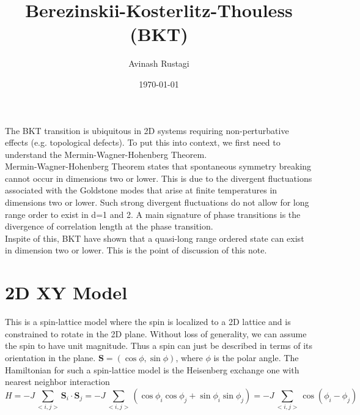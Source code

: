 \documentclass[aps,prb,onecolumn,notitlepage,showpacs,floatfix,superscriptaddress]{revtex4-1}
\begin{document}
\title{Berezinskii-Kosterlitz-Thouless (BKT)}

\author{Avinash Rustagi}
%
\date{\today}

\maketitle

The BKT transition is ubiquitous in 2D systems requiring non-perturbative effects (e.g. topological defects). To put this into context, we first need to understand the Mermin-Wagner-Hohenberg Theorem. \\

Mermin-Wagner-Hohenberg Theorem states that spontaneous symmetry breaking cannot occur in dimensions two or lower. This is due to the divergent fluctuations associated with the Goldstone modes that arise at finite temperatures in dimensions two or lower. Such strong divergent fluctuations do not allow for long range order to exist in d=1 and 2. A main signature of phase transitions is the divergence of correlation length at the phase transition. \\

Inspite of this, BKT have shown that a quasi-long range ordered state can exist in dimension two or lower. This is the point of discussion of this note.

\section{2D XY Model}
This is a spin-lattice model where the spin is localized to a 2D lattice and is constrained to rotate in the 2D plane. Without loss of generality, we can assume the spin to have unit magnitude. Thus a spin can just be described in terms of its orientation in the plane. ${\bm S}=(\cos\phi, \sin \phi)$, where $\phi$ is the polar angle. The Hamiltonian for such a spin-lattice model is the Heisenberg exchange one with nearest neighbor interaction
\begin{equation}
H=-J \sum_{<i,j>} {\bm S}_i \cdot {\bm S}_j =-J \sum_{<i,j>} \left( \cos\phi_i \cos\phi_j + \sin\phi_i \sin\phi_j\right) =-J \sum_{<i,j>} \cos\left( \phi_i - \phi_j \right)
\end{equation}
\end{document}
